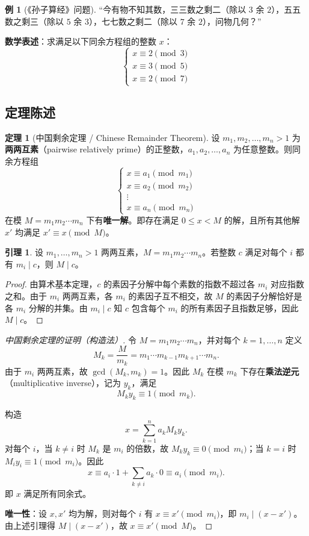 \documentclass[UTF8,11pt,a4paper]{ctexbook}   %
\theoremstyle{definition}
\newtheorem{theorem}{定理}[section]
\newtheorem{example}{例}[section]
\newtheorem{lemma}{引理}[section]
\begin{document}
\begin{example}[《孙子算经》问题]
``今有物不知其数，三三数之剩二（除以 $3$ 余 $2$），五五数之剩三（除以 $5$ 余 $3$），七七数之剩二（除以 $7$ 余 $2$），问物几何？''

\textbf{数学表述}：求满足以下同余方程组的整数 $x$：
\[
\begin{cases}
x \equiv 2 \pmod{3} \\
x \equiv 3 \pmod{5} \\
x \equiv 2 \pmod{7}
\end{cases}
\]
\end{example}

\subsection{定理陈述}

\begin{theorem}[中国剩余定理 / Chinese Remainder Theorem]
设 $m_1, m_2, \ldots, m_n > 1$ 为\textbf{两两互素}（pairwise relatively prime）的正整数，$a_1, a_2, \ldots, a_n$ 为任意整数。则同余方程组
\[
\begin{cases}
x \equiv a_1 \pmod{m_1} \\
x \equiv a_2 \pmod{m_2} \\
\vdots \\
x \equiv a_n \pmod{m_n}
\end{cases}
\]
在模 $M = m_1 m_2 \cdots m_n$ 下有\textbf{唯一解}。即存在满足 $0 \leq x < M$ 的解，且所有其他解 $x'$ 均满足 $x' \equiv x \pmod{M}$。
\end{theorem}

\begin{lemma}\label{lem:crt-divisibility}
设 $m_1, \ldots, m_n > 1$ 两两互素，$M = m_1 m_2 \cdots m_n$。若整数 $c$ 满足对每个 $i$ 都有 $m_i \mid c$，则 $M \mid c$。
\end{lemma}

\begin{proof}
由算术基本定理，$c$ 的素因子分解中每个素数的指数不超过各 $m_i$ 对应指数之和。由于 $m_i$ 两两互素，各 $m_i$ 的素因子互不相交，故 $M$ 的素因子分解恰好是各 $m_i$ 分解的并集。由 $m_i \mid c$ 知 $c$ 包含每个 $m_i$ 的所有素因子且指数足够，因此 $M \mid c$。
\end{proof}

\begin{proof}[中国剩余定理的证明（构造法）]
令 $M = m_1 m_2 \cdots m_n$，并对每个 $k=1,\ldots,n$ 定义
\[
M_k = \frac{M}{m_k} = m_1 \cdots m_{k-1} m_{k+1} \cdots m_n.
\]
由于 $m_i$ 两两互素，故 $\gcd(M_k, m_k) = 1$。因此 $M_k$ 在模 $m_k$ 下存在\textbf{乘法逆元}（multiplicative inverse），记为 $y_k$，满足
\[
M_k y_k \equiv 1 \pmod{m_k}.
\]

构造
\[
x = \sum_{k=1}^{n} a_k M_k y_k.
\]
对每个 $i$，当 $k \neq i$ 时 $M_k$ 是 $m_i$ 的倍数，故 $M_k y_k \equiv 0 \pmod{m_i}$；当 $k=i$ 时 $M_i y_i \equiv 1 \pmod{m_i}$。因此
\[
x \equiv a_i \cdot 1 + \sum_{k \neq i} a_k \cdot 0 \equiv a_i \pmod{m_i}.
\]
即 $x$ 满足所有同余式。

\textbf{唯一性}：设 $x, x'$ 均为解，则对每个 $i$ 有 $x \equiv x' \pmod{m_i}$，即 $m_i \mid (x-x')$。由上述引理得 $M \mid (x-x')$，故 $x \equiv x' \pmod{M}$。
\end{proof}
\end{document}
